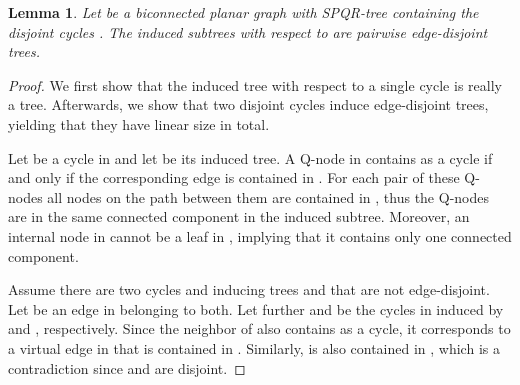 \documentclass{scrartcl}
\newcommand{\1}[1]{{\normalfont \ensuremath{#1^{\tiny\circled{1}}}}} \newcommand{\2}[1]{{\normalfont \ensuremath{#1^{\tiny\circled{2}}}}} \renewcommand{\k}[1]{{\normalfont \ensuremath{#1^{\tiny\circled{k}}}}} \newcommand{\proj}[2]{\ensuremath{\left.#1\right|_{#2}}} \newcommand{\eps}{\varepsilon}
\theoremstyle{plain} \newtheorem{theorem}{Theorem} \newcounter{lemmacounter} \setcounter{lemmacounter}{0} \newtheorem{lemma}[lemmacounter]{Lemma} \newtheorem{fact}{Fact}  \newtheorem{corollary}{Corollary} \theoremstyle{definition} \newtheorem{definition}{Definition}
\begin{document}
\begin{lemma}
  Let  be a biconnected planar graph with SPQR-tree 
  containing the disjoint cycles .
  The induced subtrees  with respect to  are pairwise
  edge-disjoint trees.
\end{lemma}
\begin{proof}
  We first show that the induced tree with respect to a single cycle
  is really a tree.  Afterwards, we show that two disjoint cycles
  induce edge-disjoint trees, yielding that they have linear size in
  total.

  Let  be a cycle in  and let  be its
  induced tree.  A Q-node in  contains  as a cycle if
  and only if the corresponding edge is contained in .  For each
  pair of these Q-nodes all nodes on the path between them are
  contained in , thus the Q-nodes are in the
  same connected component in the induced subtree.  Moreover, an
  internal node in  cannot be a leaf in , implying that it contains only one connected component.

  Assume there are two cycles  and  inducing trees
   and  that are not
  edge-disjoint.  Let  be an edge in 
  belonging to both.  Let further  and  be the
  cycles in  induced by  and , respectively.
  Since the neighbor  of  also contains  as a cycle,
  it corresponds to a virtual edge  in  that is contained
  in .  Similarly,  is also contained in ,
  which is a contradiction since  and  are disjoint.
\end{proof}
\end{document}
